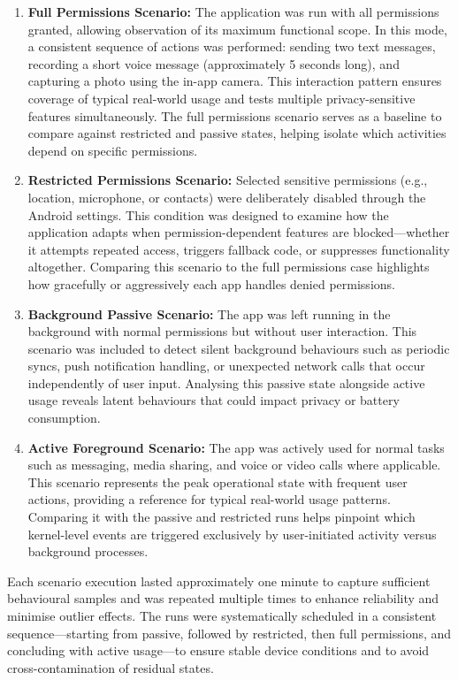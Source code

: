 \documentclass[a4paper,12pt]{report}
\begin{document}
\begin{enumerate}[label=\roman*.]
  \item \textbf{Full Permissions Scenario:} The application was run with all permissions granted, allowing observation of its maximum functional scope. In this mode, a consistent sequence of actions was performed: sending two text messages, recording a short voice message (approximately 5 seconds long), and capturing a photo using the in-app camera. This interaction pattern ensures coverage of typical real-world usage and tests multiple privacy-sensitive features simultaneously. The full permissions scenario serves as a baseline to compare against restricted and passive states, helping isolate which activities depend on specific permissions.

  \item \textbf{Restricted Permissions Scenario:} Selected sensitive permissions (e.g., location, microphone, or contacts) were deliberately disabled through the Android settings. This condition was designed to examine how the application adapts when permission-dependent features are blocked—whether it attempts repeated access, triggers fallback code, or suppresses functionality altogether. Comparing this scenario to the full permissions case highlights how gracefully or aggressively each app handles denied permissions.

  \item \textbf{Background Passive Scenario:} The app was left running in the background with normal permissions but without user interaction. This scenario was included to detect silent background behaviours such as periodic syncs, push notification handling, or unexpected network calls that occur independently of user input. Analysing this passive state alongside active usage reveals latent behaviours that could impact privacy or battery consumption.

  \item \textbf{Active Foreground Scenario:} The app was actively used for normal tasks such as messaging, media sharing, and voice or video calls where applicable. This scenario represents the peak operational state with frequent user actions, providing a reference for typical real-world usage patterns. Comparing it with the passive and restricted runs helps pinpoint which kernel-level events are triggered exclusively by user-initiated activity versus background processes.
\end{enumerate}

Each scenario execution lasted approximately one minute to capture sufficient behavioural samples and was repeated multiple times to enhance reliability and minimise outlier effects. The runs were systematically scheduled in a consistent sequence—starting from passive, followed by restricted, then full permissions, and concluding with active usage—to ensure stable device conditions and to avoid cross-contamination of residual states.
\end{document}
